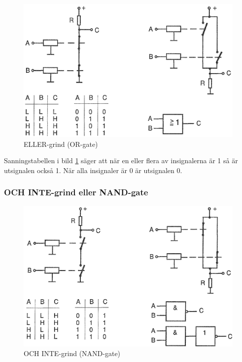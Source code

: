 \begin{figure}
\includegraphics[width=\textwidth]{images/cropped_pdfs/bild_2_2-38.pdf}
\caption{ELLER-grind (OR-gate)}
\label{fig:BildII2-38}
\end{figure}

Sanningstabellen i bild \ref{fig:BildII2-38} säger att när en eller
flera av insignalerna är 1 så är utsignalen också 1. När alla
insignaler är 0 är utsignalen 0.

\subsubsection{OCH INTE-grind eller NAND-gate}

\begin{figure}
\includegraphics[width=\textwidth]{images/cropped_pdfs/bild_2_2-39.pdf}
\caption{OCH INTE-grind (NAND-gate)}
\label{fig:BildII2-39}
\end{figure}

